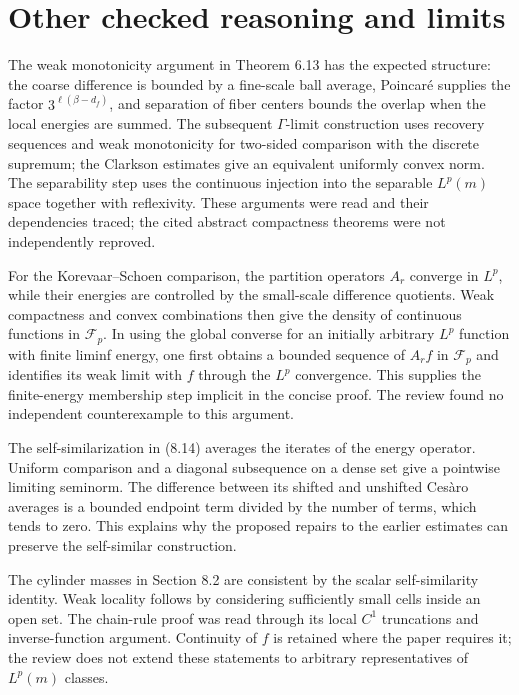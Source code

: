 \documentclass[10pt]{article}
\begin{document}
\section*{Other checked reasoning and limits}
The weak monotonicity argument in Theorem 6.13 has the expected structure: the coarse difference is bounded by a fine-scale ball average, Poincaré supplies the factor \(3^{\ell(\beta-d_f)}\), and separation of fiber centers bounds the overlap when the local energies are summed. The subsequent \(\Gamma\)-limit construction uses recovery sequences and weak monotonicity for two-sided comparison with the discrete supremum; the Clarkson estimates give an equivalent uniformly convex norm. The separability step uses the continuous injection into the separable \(L^p(m)\) space together with reflexivity. These arguments were read and their dependencies traced; the cited abstract compactness theorems were not independently reproved.\par
For the Korevaar–Schoen comparison, the partition operators \(A_r\) converge in \(L^p\), while their energies are controlled by the small-scale difference quotients. Weak compactness and convex combinations then give the density of continuous functions in \(\mathcal F_p\). In using the global converse for an initially arbitrary \(L^p\) function with finite liminf energy, one first obtains a bounded sequence of \(A_r f\) in \(\mathcal F_p\) and identifies its weak limit with \(f\) through the \(L^p\) convergence. This supplies the finite-energy membership step implicit in the concise proof. The review found no independent counterexample to this argument.\par
The self-similarization in (8.14) averages the iterates of the energy operator. Uniform comparison and a diagonal subsequence on a dense set give a pointwise limiting seminorm. The difference between its shifted and unshifted Cesàro averages is a bounded endpoint term divided by the number of terms, which tends to zero. This explains why the proposed repairs to the earlier estimates can preserve the self-similar construction.\par
The cylinder masses in Section 8.2 are consistent by the scalar self-similarity identity. Weak locality follows by considering sufficiently small cells inside an open set. The chain-rule proof was read through its local \(C^1\) truncations and inverse-function argument. Continuity of \(f\) is retained where the paper requires it; the review does not extend these statements to arbitrary representatives of \(L^p(m)\) classes.\par
\end{document}
